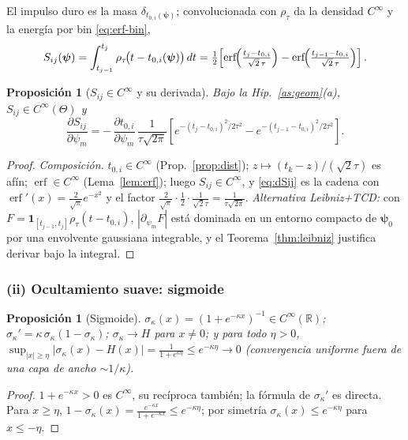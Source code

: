 \documentclass[11pt,a4paper]{article}
\theoremstyle{plain}
\newtheorem{proposition}[theorem]{Proposici\'on}
\theoremstyle{definition}
\newcommand{\vect}[1]{\boldsymbol{#1}}
\newcommand{\R}{\mathbb{R}}
\newcommand{\erf}{\operatorname{erf}}
\newcommand{\abs}[1]{\left\lvert #1 \right\rvert}
\begin{document}
El impulso duro es la masa $\delta_{t_{0,i}(\vect{\psi})}$; convolucionada con
$\rho_\tau$ da la densidad $C^\infty$ y la energ\'ia por bin \eqref{eq:erf-bin},
\begin{equation}
    S_{ij}(\vect{\psi})
    =\int_{t_{j-1}}^{t_j}\rho_\tau\!\bigl(t-t_{0,i}(\vect{\psi})\bigr)\,dt
    =\tfrac12\!\left[
        \erf\!\Bigl(\tfrac{t_j-t_{0,i}}{\sqrt2\,\tau}\Bigr)
        -\erf\!\Bigl(\tfrac{t_{j-1}-t_{0,i}}{\sqrt2\,\tau}\Bigr)
    \right].
    \label{eq:Sij}
\end{equation}

\begin{proposition}[$S_{ij}\in C^\infty$ y su derivada]\label{prop:Sij}
Bajo la Hip.~\ref{as:geom}(a), $S_{ij}\in C^\infty(\Theta)$ y
\begin{equation}
    \frac{\partial S_{ij}}{\partial\psi_m}
    =-\,\frac{\partial t_{0,i}}{\partial\psi_m}\,
    \frac{1}{\tau\sqrt{2\pi}}
    \left[
        e^{-(t_j-t_{0,i})^2/2\tau^2}
        - e^{-(t_{j-1}-t_{0,i})^2/2\tau^2}
    \right].
    \label{eq:dSij}
\end{equation}
\end{proposition}
\begin{proof}
\emph{Composici\'on.} $t_{0,i}\in C^\infty$ (Prop.~\ref{prop:dist});
$z\mapsto(t_k-z)/(\sqrt2\tau)$ es af\'in; $\erf\in C^\infty$
(Lema~\ref{lem:erf}); luego $S_{ij}\in C^\infty$, y \eqref{eq:dSij} es la cadena
con $\erf'(x)=\frac{2}{\sqrt\pi}e^{-x^2}$ y el factor
$\frac{2}{\sqrt\pi}\cdot\frac12\cdot\frac{1}{\sqrt2\tau}=\frac{1}{\tau\sqrt{2\pi}}$.
\emph{Alternativa Leibniz+TCD:} con $F=\mathbf 1_{[t_{j-1},t_j]}\rho_\tau(t-t_{0,i})$,
$\abs{\partial_{\psi_m}F}$ est\'a dominada en un entorno compacto de
$\vect{\psi}_0$ por una envolvente gaussiana integrable, y el
Teorema~\ref{thm:leibniz} justifica derivar bajo la integral.
\end{proof}

\subsubsection*{(ii) Ocultamiento suave: sigmoide}

\begin{proposition}[Sigmoide]\label{prop:sigmoid}
$\sigma_\kappa(x)=(1+e^{-\kappa x})^{-1}\in C^\infty(\R)$;
$\sigma_\kappa'=\kappa\,\sigma_\kappa(1-\sigma_\kappa)$;
$\sigma_\kappa\to H$ para $x\neq0$; y para todo $\eta>0$,
$\sup_{\abs{x}\ge\eta}\abs{\sigma_\kappa(x)-H(x)}=\frac{1}{1+e^{\kappa\eta}}\le
e^{-\kappa\eta}\to0$ (convergencia uniforme fuera de una capa de ancho
$\sim1/\kappa$).
\end{proposition}
\begin{proof}
$1+e^{-\kappa x}>0$ es $C^\infty$, su rec\'iproca tambi\'en; la f\'ormula de
$\sigma_\kappa'$ es directa. Para $x\ge\eta$,
$1-\sigma_\kappa(x)=\frac{e^{-\kappa x}}{1+e^{-\kappa x}}\le e^{-\kappa\eta}$; por
simetr\'ia $\sigma_\kappa(x)\le e^{-\kappa\eta}$ para $x\le-\eta$.
\end{proof}
\end{document}
